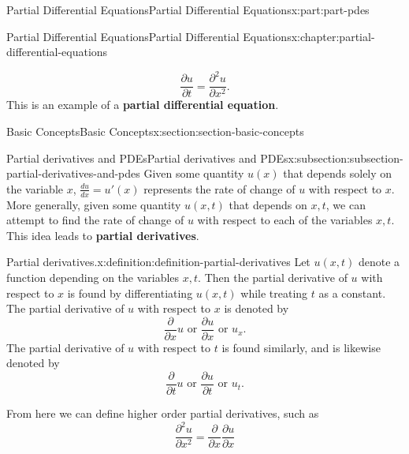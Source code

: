 \documentclass[oneside,10pt,]{book}
\newcommand{\terminology}[1]{\textbf{#1}}
\numberwithin{equation}{part}
\begin{document}
\begin{partptx}{Partial Differential Equations}{}{Partial Differential Equations}{}{}{x:part:part-pdes}
\begin{chapterptx}{Partial Differential Equations}{}{Partial Differential Equations}{}{}{x:chapter:partial-differential-equations}
\begin{introduction}{}
%
\begin{equation*}
\frac{\partial u}{\partial t} = \frac{\partial^{2}u}{\partial x^{2}}.
\end{equation*}
This is an example of a \terminology{partial differential equation}.%
\end{introduction}%
%
%
\typeout{************************************************}
\typeout{************************************************}
%
\begin{sectionptx}{Basic Concepts}{}{Basic Concepts}{}{}{x:section:section-basic-concepts}
%
%
\typeout{************************************************}
\typeout{************************************************}
%
\begin{subsectionptx}{Partial derivatives and PDEs}{}{Partial derivatives and PDEs}{}{}{x:subsection:subsection-partial-derivatives-and-pdes}
Given some quantity \(u(x)\) that depends solely on the variable \(x\), \(\frac{du}{dx} = u'(x)\) represents the rate of change of \(u\) with respect to \(x\). More generally, given some quantity \(u(x,t)\) that depends on \(x,t\), we can attempt to find the rate of change of \(u\) with respect to each of the variables \(x,t\). This idea leads to \terminology{partial derivatives}.%
\begin{definition}{Partial derivatives.}{x:definition:definition-partial-derivatives}%
%
Let \(u(x,t)\) denote a function depending on the variables \(x,t\). Then the partial derivative of \(u\) with respect to \(x\) is found by differentiating \(u(x,t)\) while treating \(t\) as a constant. The partial derivative of \(u\) with respect to \(x\) is denoted by%
\begin{equation*}
\frac{\partial}{\partial x}u\text{ or }\frac{\partial u}{\partial x}\text{ or }u_{x}.
\end{equation*}
The partial derivative of \(u\) with respect to \(t\) is found similarly, and is likewise denoted by%
\begin{equation*}
\frac{\partial}{\partial t}u\text{ or }\frac{\partial u}{\partial t}\text{ or }u_{t}.
\end{equation*}
%
\end{definition}
From here we can define higher order partial derivatives, such as%
\begin{equation*}
\frac{\partial^{2}u}{\partial x^{2}} = \frac{\partial}{\partial x}\frac{\partial u}{\partial x}
\end{equation*}

\end{subsectionptx}
\end{sectionptx}
\end{chapterptx}
\end{partptx}
\end{document}
